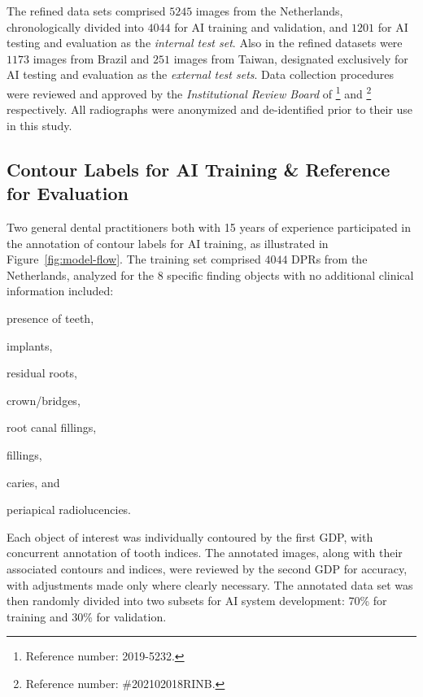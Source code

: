 The refined data sets comprised $\num{5245}$ images from the Netherlands, chronologically divided into $\num{4044}$ for AI training and validation, and $\num{1201}$ for AI testing and evaluation as the \emph{internal test set}. 
Also in the refined datasets were $\num{1173}$ images from Brazil and $\num{251}$ images from Taiwan, designated exclusively for AI testing and evaluation as the \emph{external test sets}.
Data collection procedures were reviewed and approved by the \emph{Institutional Review Board} of \hospitalN\footnote{Reference number: 2019-5232.} and \hospitalT\footnote{Reference number: \#202102018RINB.} respectively. 
All radiographs were anonymized and de-identified prior to their use in this study.

\subsection{Contour Labels for AI Training \& Reference for Evaluation}
\label{sec:label-for-training}



Two general dental practitioners both with 15 years of experience participated in the annotation of contour labels for AI training, as illustrated in Figure~\ref{fig:model-flow}. 
The training set comprised $\num{4044}$ DPRs from the Netherlands, analyzed for the 8 specific finding objects with no additional clinical information included:
\begin{enumerate*}[label=(\alph*)]
    \item presence of teeth,
    \item implants,
    \item residual roots, 
    \item crown/bridges, 
    \item root canal fillings, 
    \item fillings, 
    \item caries, and
    \item periapical radiolucencies.
\end{enumerate*}
Each object of interest was individually contoured by the first GDP, with concurrent annotation of tooth indices.
The annotated images, along with their associated contours and indices, were reviewed by the second GDP for accuracy, with adjustments made only where clearly necessary.
The annotated data set was then randomly divided into two subsets for AI system development: 70\% for training and 30\% for validation.


